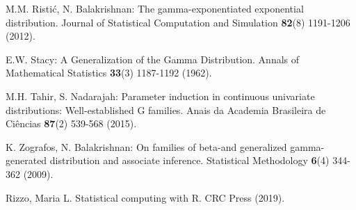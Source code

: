 \documentclass[twoside,leqno,11pt]{article}
\begin{document}
\begin{thebibliography}{8}
\item
M.M. Risti\'{c}, N. Balakrishnan:
The gamma-exponentiated exponential distribution.
Journal of Statistical Computation and Simulation {\bf 82}(8) 1191-1206 (2012).

\item
E.W. Stacy: A Generalization of the Gamma Distribution. Annals of Mathematical Statistics {\bf 33}(3) 1187-1192 (1962).

\item
M.H. Tahir, S. Nadarajah:
Parameter induction in continuous univariate distributions: Well-established G families.
Anais da Academia Brasileira de Ci\^{e}ncias {\bf 87}(2) 539-568 (2015).

\item
K. Zografos, N. Balakrishnan:
On families of beta-and generalized gamma-generated distribution and
associate inference.  Statistical Methodology {\bf 6}(4) 344-362 (2009).

\item 
Rizzo, Maria L. Statistical computing with R. CRC Press (2019).

\end{thebibliography}
\end{document}
